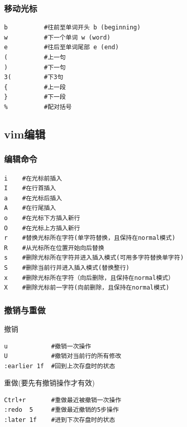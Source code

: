 \documentclass[xcolor=svgnames,presentation]{beamer}
\begin{document}
\begin{frame}[fragile]
\frametitle{移动光标}
\label{sec-4-2-3}
\label{sec-4-2-3-1}


\begin{verbatim}
b          #往前至单词开头 b (beginning)
w          #下一个单词 w (word)
e          #往后至单词尾部 e (end)
(          #上一句
)          #下一句
3(         #下3句
{          #上一段
}          #下一段
%          #配对括号
\end{verbatim}
\end{frame}
\subsection{vim编辑}
\label{sec-4-3}
\begin{frame}[fragile]
\frametitle{编辑命令}
\label{sec-4-3-1}
\label{sec-4-3-1-1}


\begin{verbatim}
i    #在光标前插入
I    #在行首插入
a    #在光标后插入
A    #在行尾插入
o    #在光标下方插入新行
O    #在光标上方插入新行
r    #替换光标所在字符(单字符替换，且保持在normal模式)
R    #从光标所在位置开始向后替换
s    #删除光标所在字符并进入插入模式(可用多字符替换单字符)
S    #删除当前行并进入插入模式(替换整行)
x    #删除光标所在字符（向后删除，且保持在normal模式）
X    #删除光标前一字符(向前删除，且保持在normal模式)
\end{verbatim}
\end{frame}
\begin{frame}[fragile]
\frametitle{撤销与重做}
\label{sec-4-3-2}
\begin{exampleblock}{撤销}
\label{sec-4-3-2-1}


\begin{verbatim}
u            #撤销一次操作
U            #撤销对当前行的所有修改
:earlier 1f  #回到上次存盘时的状态
\end{verbatim}
\end{exampleblock}
\begin{block}{重做(要先有撤销操作才有效)}
\label{sec-4-3-2-2}


\begin{verbatim}
Ctrl+r       #重做最近被撤销一次操作
:redo  5     #重做最近撤销的5步操作
:later 1f    #进到下次存盘时的状态
\end{verbatim}
\end{block}
\end{frame}
\end{document}
